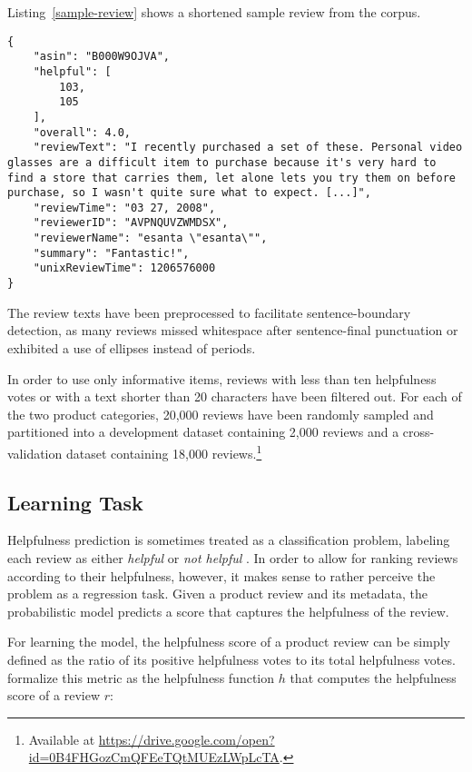\documentclass[
    a4paper,%
    12pt,%
    oneside,%
    toc=bibliography,
    final,
]{scrartcl}
\begin{document}
Listing~\ref{sample-review} shows a shortened sample review from the corpus.

\begin{lstlisting}[basicstyle=\ttfamily\small\singlespacing, caption=Sample review (shortened) from the “Electronics” category., label=sample-review, float]
{
    "asin": "B000W9OJVA",
    "helpful": [
        103,
        105
    ],
    "overall": 4.0,
    "reviewText": "I recently purchased a set of these. Personal video glasses are a difficult item to purchase because it's very hard to find a store that carries them, let alone lets you try them on before purchase, so I wasn't quite sure what to expect. [...]",
    "reviewTime": "03 27, 2008",
    "reviewerID": "AVPNQUVZWMDSX",
    "reviewerName": "esanta \"esanta\"",
    "summary": "Fantastic!",
    "unixReviewTime": 1206576000
}
\end{lstlisting}

The review texts have been preprocessed to facilitate sentence-boundary detection, as many reviews missed whitespace after sentence-final punctuation or exhibited a use of ellipses instead of periods.

In order to use only informative items, reviews with less than ten helpfulness votes or with a text shorter than 20 characters have been filtered out. For each of the two product categories, 20,000 reviews have been randomly sampled and partitioned into a development dataset containing 2,000 reviews and a cross-validation dataset containing 18,000 reviews.\footnote{Available at \url{https://drive.google.com/open?id=0B4FHGozCmQFEeTQtMUEzLWpLcTA}.}

\subsection{Learning Task}

Helpfulness prediction is sometimes treated as a classification problem, labeling each review as either \textit{helpful} or \textit{not helpful} \citep[see][3ff.]{Almagrabi2015}. In order to allow for ranking reviews according to their helpfulness, however, it makes sense to rather perceive the problem as a regression task. Given a product review and its metadata, the probabilistic model predicts a score that captures the helpfulness of the review.

For learning the model, the helpfulness score of a product review can be simply defined as the ratio of its positive helpfulness votes to its total helpfulness votes. \citet[424]{Kim2006} formalize this metric as the helpfulness function $ h $ that computes the helpfulness score of a review $ r $:
\end{document}
